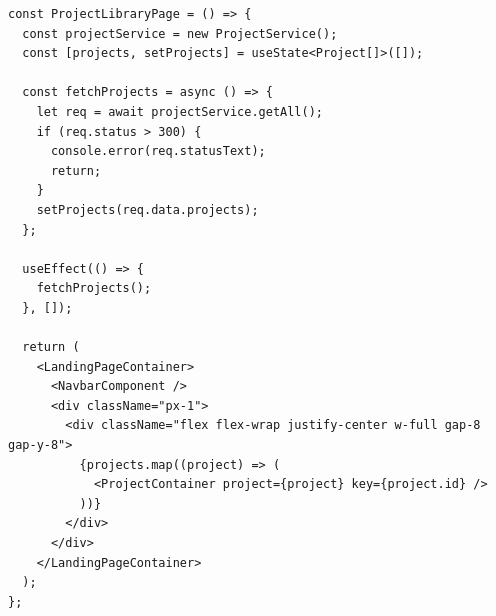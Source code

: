 \begin{lstlisting}[caption={Função ProjectLibraryPage}, label={lst:frontend-ProjectLibraryPage}]
const ProjectLibraryPage = () => {
  const projectService = new ProjectService();
  const [projects, setProjects] = useState<Project[]>([]);

  const fetchProjects = async () => {
    let req = await projectService.getAll();
    if (req.status > 300) {
      console.error(req.statusText);
      return;
    }
    setProjects(req.data.projects);
  };

  useEffect(() => {
    fetchProjects();
  }, []);

  return (
    <LandingPageContainer>
      <NavbarComponent />
      <div className="px-1">
        <div className="flex flex-wrap justify-center w-full gap-8 gap-y-8">
          {projects.map((project) => (
            <ProjectContainer project={project} key={project.id} />
          ))}
        </div>
      </div>
    </LandingPageContainer>
  );
};
\end{lstlisting}
